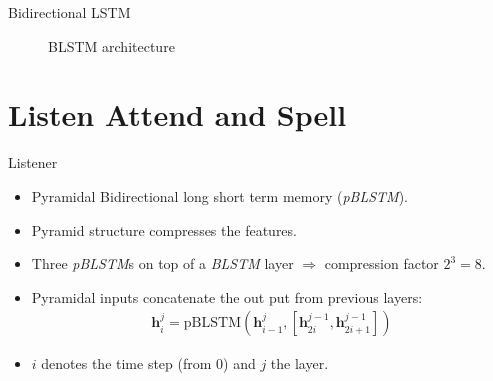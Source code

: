 \documentclass{beamer}
\begin{document}
\begin{frame}{Bidirectional LSTM}
	\begin{figure}
		
		\caption{BLSTM architecture}
		\label{fig:blstm}
	\end{figure}
\end{frame}


\section{Listen Attend and Spell}


\begin{frame}{Listener}
\begin{itemize}
	\item Pyramidal Bidirectional long short term memory (\textit{pBLSTM}).
	\item Pyramid structure compresses the features. 
	\item Three \textit{pBLSTM}s on top of a \textit{BLSTM} layer $\Rightarrow$ compression factor $2^3 = 8 $.
	\item Pyramidal inputs concatenate the out put from previous layers:
		  \begin{align}
		  	\mathbf{h}_i^j = \text{pBLSTM}(\mathbf{h}_{i-1}^j, [\mathbf{h}_{2i}^{j-1}, \mathbf{h}_{2i+1}^{j-1}])
		  \end{align}
	\item $i$ denotes the time step (from $0$) and $j$ the layer.
\end{itemize}
\end{frame}
\end{document}

